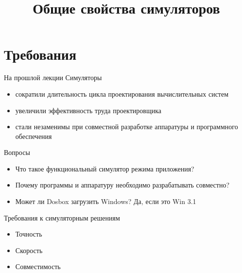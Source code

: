 

\title{Общие свойства симуляторов}



\begin{frame}
    \maketitle
\end{frame}

\begin{frame}
    \tableofcontents
\end{frame}

\section{Требования}

\begin{frame}{На прошлой лекции}
Симуляторы
\begin{itemize}
\item сократили длительность цикла проектирования вычислительных систем
\item увеличили эффективность труда проектировщика
\item стали незаменимы при совместной разработке аппаратуры и программного обеспечения
\end{itemize}
\end{frame}

\begin{frame}{Вопросы}
\begin{itemize}
\item Что такое функциональный симулятор режима приложения?\pause 
\item Почему программы и аппаратуру необходимо разрабатывать совместно?\pause
\item Может ли Dosbox загрузить Windows? \pause Да, если это Win 3.1
\end{itemize}
\end{frame}


\begin{frame}{Требования к симуляторным решениям}
\begin{itemize}
\item Точность
\item Скорость
\item Совместимость
\end{itemize}
\end{frame}

